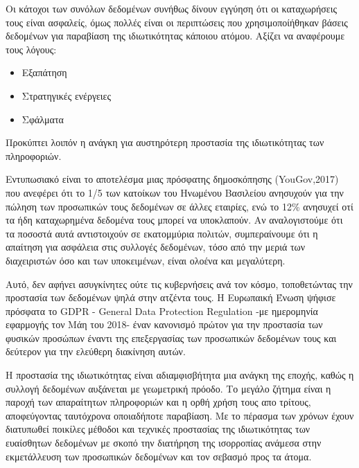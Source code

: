 Οι κάτοχοι των συνόλων δεδομένων συνήθως δίνουν εγγύηση ότι οι καταχωρήσεις τους είναι ασφαλείς, όμως πολλές είναι οι περιπτώσεις που χρησιμοποίήθηκαν βάσεις δεδομένων για παραβίαση της ιδιωτικότητας κάποιου ατόμου. Αξίζει να αναφέρουμε τους λόγους:
\begin{itemize}
\item Εξαπάτηση
\item Στρατηγικές ενέργειες
\item Σφάλματα
\end{itemize}
Προκύπτει λοιπόν η ανάγκη για αυστηρότερη προστασία της ιδιωτικότητας των πληροφοριών.

Εντυπωσιακό είναι το αποτελέσμα μιας πρόσφατης δημοσκόπησης (\textlatin{YouGov,2017}) που ανεφέρει ότι το 1/5 των κατοίκων του Ηνωμένου Βασιλείου ανησυχούν για την πώληση των προσωπικών τους δεδομένων σε άλλες εταιρίες, ενώ το 12\% ανησυχεί οτί τα ήδη καταχωρημένα δεδομένα τους μπορεί να υποκλαπούν. Αν αναλογιστούμε ότι τα ποσοστά αυτά αντιστοιχούν σε εκατομμύρια πολιτών, συμπεραίνουμε ότι η απαίτηση για ασφάλεια στις συλλογές δεδομένων, τόσο από την μεριά των διαχειριστών όσο και των υποκειμένων, είναι ολοένα και μεγαλύτερη. 

Αυτό, δεν αφήνει ασυγκίνητες ούτε τις κυβερνήσεις ανά τον κόσμο, τοποθετώντας την προστασία των δεδομένων ψηλά στην ατζέντα τους. Η Ευρωπαική Ένωση ψήφισε πρόσφατα το \textlatin{GDPR - General Data Protection Regulation} -με ημερομηνία εφαρμογής τον Μάη του 2018- έναν κανονισμό πρώτον για την προστασία των φυσικών προσώπων έναντι της επεξεργασίας των προσωπικών δεδομένων τους και δεύτερον για την ελεύθερη διακίνηση αυτών.

Η προστασία της ιδιωτικότητας είναι αδιαμφισβήτητα μια ανάγκη της εποχής, καθώς η συλλογή δεδομένων αυξάνεται με γεωμετρική πρόοδο. Το μεγάλο ζήτημα είναι η παροχή των απαραίτητων πληροφοριών και η ορθή χρήση τους απο τρίτους, αποφεύγοντας ταυτόχρονα οποιαδήποτε παραβίαση. Με το πέρασμα των χρόνων έχουν διατυπωθεί ποικίλες μέθοδοι και τεχνικές προστασίας της ιδιωτικότητας των ευαίσθητων δεδομένων με σκοπό την διατήρηση της ισορροπίας ανάμεσα στην εκμετάλλευση των προσωπικών δεδομένων και τον σεβασμό προς τα άτομα.



